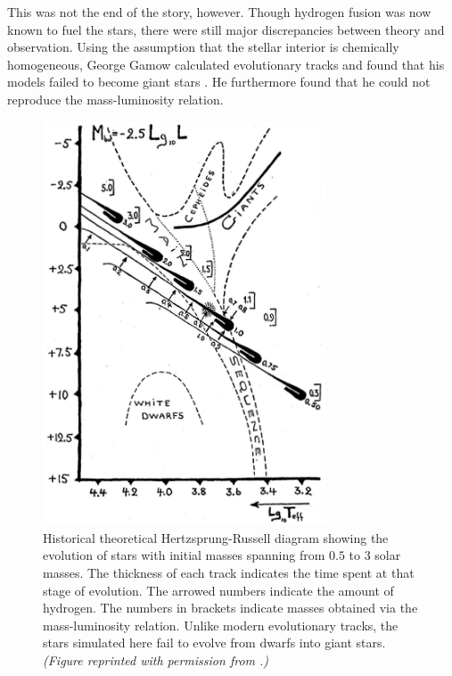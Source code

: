 This was not the end of the story, however. 
Though hydrogen fusion was now known to fuel the stars, there were still major discrepancies between theory and observation. 
Using the assumption that the stellar interior is chemically homogeneous, George Gamow calculated evolutionary tracks and found that his models failed to become giant stars \citep[][see also Figure~\ref{fig:gamow-tracks}]{1938PhRv...53..907G}.
He furthermore found that he could not reproduce the mass-luminosity relation. 

\begin{figure}
    \centering
    \includegraphics[width=0.75\textwidth]{ch1_introduction/pics/gamow-tracks.png}
    \caption[Historical theoretical H-R diagram]{
        Historical theoretical Hertzsprung-Russell diagram showing the evolution of stars with initial masses spanning from $0.5$ to $3$ solar masses. 
        The thickness of each track indicates the time spent at that stage of evolution. 
        The arrowed numbers indicate the amount of hydrogen. 
        The numbers in brackets indicate masses obtained via the mass-luminosity relation. 
        Unlike modern evolutionary tracks, the stars simulated here fail to evolve from dwarfs into giant stars. 
        \emph{(Figure reprinted with permission from \citealt{1938PhRv...53..907G}.)}
    \label{fig:gamow-tracks}}
\end{figure}

